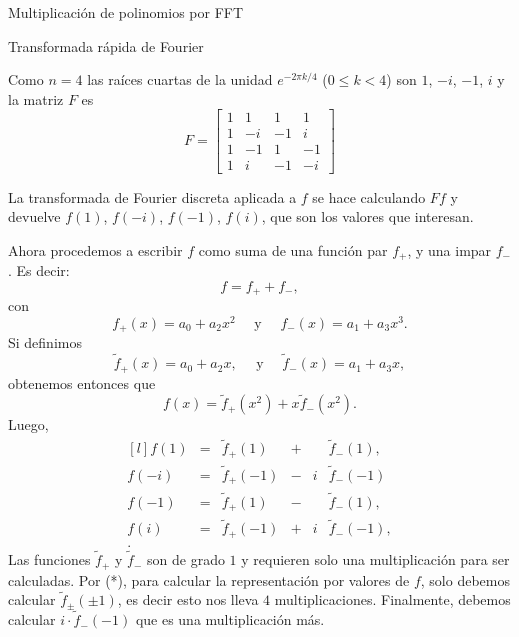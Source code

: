 \begin{chapter}{Multiplicación de polinomios por FFT}
\begin{section}{Transformada rápida de Fourier}
\begin{ejemplo*}
            Como $n=4$ las raíces cuartas de la unidad $e^{-2\pi k/4}$ ($0 \le k < 4$) son $1$, $-i$, $-1$, $i$ y la matriz $F$  es
            \begin{equation*}
                F=\begin{bmatrix}
                    1 & 1 & 1 & 1 \\
                    1 & -i & -1 & i \\
                    1 & -1 & 1 &  -1\\
                    1 & i & -1 &  -i
                \end{bmatrix}
            \end{equation*}
            
            La transformada de Fourier discreta aplicada a $f$ se hace calculando $Ff$ y  devuelve  $f(1)$, $f(-i)$, $f(-1)$, $f(i)$,  que son los valores que interesan. 
            
            Ahora procedemos a escribir  $f $ como suma de una función par $f_+$, y una impar $f_-$. Es decir:
            $$
            f = f_+ + f_-,$$
            con 
            $$ f_+(x) = a_0 + a_2x^2 \quad  \text{ y } \quad f_-(x) = a_1 + a_3x^3.
            $$
            Si definimos 
            $$
            \tilde{f}_+(x) = a_0 + a_2 x, \quad \text{ y } \quad \tilde{f}_-(x) = a_1 + a_3 x,
            $$
            obtenemos entonces que 
            \begin{equation*}
                f(x) = \tilde{f}_+(x^2) + x \tilde{f}_-(x^2).
            \end{equation*}
            Luego,
            \begin{equation}
                \begin{matrix*}[l]
                    f(1) &=& \tilde{f}_+(1)& + & &\tilde{f}_-(1), \\
                    f(-i) &=& \tilde{f}_+(-1) &-&i & \tilde{f}_-(-1)\\
                    f(-1) &=& \tilde{f}_+(1)& -&  &\tilde{f}_-(1), \\
                    f(i) &=& \tilde{f}_+(-1)& +&  i&\tilde{f}_-(-1), \\.
                \end{matrix*} \tag{*}
            \end{equation}
            Las funciones $\tilde{f}_+$ y $\tilde{f}_-$ son de grado $1$ y requieren solo una multiplicación para ser calculadas. Por (*), para calcular la representación por valores de $f$, solo debemos calcular $\tilde{f}_\pm(\pm1)$,  es decir esto nos lleva $4$ multiplicaciones. Finalmente,  debemos  calcular $ i \cdot \tilde{f}_-(-1)$  que es una multiplicación más. 


\end{ejemplo*}
\end{section}
\end{chapter}
